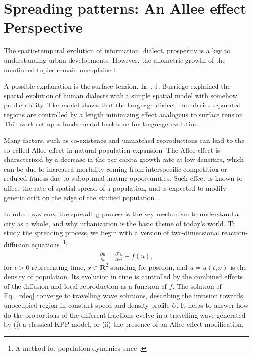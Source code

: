 \chapter{Spreading patterns: An Allee effect Perspective}

The spatio-temporal evolution of information, dialect, prosperity is a key to understanding urban developments. However, the allometric growth of the mentioned topics remain unexplained. 

A possible explanation is the surface tension. In~\cite{PhysRevX.7.031008}, J. Burridge explained the spatial evolution of human dialects with a simple spatial model with somehow predictability. The model shows that the language dialect boundaries separated regions are controlled by a length minimizing effect analogous to surface tension. This work set up a fundamental backbone for language evolution.

Many factors, such as co-existence and unmatched reproductions can lead to the so-called Allee effect in natural population expansion. The Allee effect is characterized by a decrease in the per capita growth rate at low densities, which can be due to increased mortality coming from interspecific competition or reduced fitness due to suboptimal mating opportunities. Such effect is known to affect the rate of spatial spread of a population, and is expected to modify genetic drift on the edge of the studied population~\cite{alleeevidence,spatialwaveallee}.

In urban systems, the spreading process is the key mechanism to understand a city as a whole, and why urbanization is the basic theme of today's world. To study the spreading process, we begin with a version of two-dimensional reaction-diffusion equations~\footnote{A method for population dynamics since \cite{skellam1951random}.}:\begin{align}
    \frac{\partial u}{\partial t} = \frac{\partial^2 u}{\partial x^2} + f(u),\label{rdeq}
\end{align} for $t>0$ representing time, $x\in \mathbf{R}^2$ standing for position, and $u = u(t,x)$ is the density of population. Its evolution in time is controlled by the combined effects of the diffusion and local reproduction as a function of $f$. The solution of Eq.~\ref{rdeq} converge to travelling wave solutions, describing the invasion towards unoccupied region in constant speed and density profile $U$. It helps to answer how do the proportions of the different fractions evolve in a travelling wave generated by (i) a classical KPP model, or (ii) the presence of an Allee effect modification.


